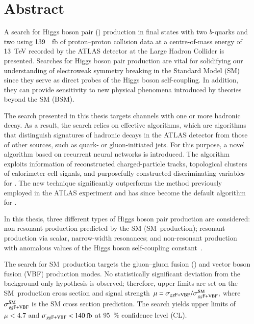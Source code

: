 \chapter*{Abstract}

A search for Higgs boson pair (\HH) production in final states with two
$b$-quarks and two \tauleptons using \SI{139}{\per\femto\barn} of proton--proton
collision data at a centre-of-mass energy of \SI{13}{\TeV} recorded by the ATLAS
detector at the Large Hadron Collider is presented. Searches for Higgs boson
pair production are vital for solidifying our understanding of electroweak
symmetry breaking in the Standard Model (SM) since they serve as direct probes
of the Higgs boson self-coupling. In addition, they can provide sensitivity to
new physical phenomena introduced by theories beyond the SM (BSM).

The search presented in this thesis targets channels with one or more hadronic
\taulepton decay. As a result, the search relies on effective \tauid algorithms,
which are algorithms that distinguish signatures of hadronic \taulepton decays
in the ATLAS detector from those of other sources, such as quark- or
gluon-initiated jets. For this purpose, a novel \tauid algorithm based on
recurrent neural networks is introduced. The algorithm exploits information of
reconstructed charged-particle tracks, topological clusters of calorimeter cell
signals, and purposefully constructed discriminating variables for \tauid. The
new technique significantly outperforms the method previously employed in the
ATLAS experiment and has since become the default algorithm for \tauid.

In this thesis, three different types of Higgs boson pair production are
considered: non-resonant \HH production predicted by the SM (SM~\HH production);
resonant \HH production via scalar, narrow-width resonances; and non-resonant
\HH production with anomalous values of the Higgs boson self-coupling
constant~\lambdahhh.

The search for SM~\HH production targets the gluon--gluon fusion (\ggF) and
vector boson fusion (VBF) production modes. No statistically significant
deviation from the background-only hypothesis is observed; therefore, upper
limits are set on the SM~\HH production cross section \xsecggfvbf and signal
strength~$\mu = \sigma_{gg\text{F+VBF}} / \sigma_{gg\text{F+VBF}}^{\text{SM}}$, where
$\sigma_{gg\text{F+VBF}}^{\text{SM}}$ is the SM cross section prediction. The search yields
upper limits of $\mu < \num{4.7}$ and $\xsecggfvbf < \SI{140}{\femto\barn}$ at
\SI{95}{\percent} confidence level (CL).

